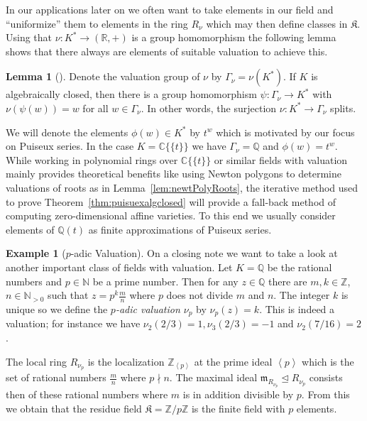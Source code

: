 \documentclass[
  paper=a4,
  titlepage,
  bibliography=totoc,
  listof=totoc,
  pagesize=pdftex
]{scrartcl}
\numberwithin{figure}{section}
\numberwithin{equation}{section}
\numberwithin{table}{section}
\newcommand*\setZ{\mathds{Z}}
\newcommand*\setR{\mathds{R}}
\newcommand*\setC{\mathds{C}}
\newcommand*\setQ{\mathds{Q}}
\newcommand*\setN{\mathds{N}}
\newcommand*\ideal[1]{\left\langle #1 \right\rangle}
\newcommand*\puiseux[2]{#1\{\!\{#2\}\!\}}
\newcommand*\CCt{\puiseux{\setC}{t}}
\let\idealof\trianglelefteq
\theoremstyle{definition}
\newtheorem{example}[definition]{Example}
\newtheorem{lemma}[definition]{Lemma}
\numberwithin{definition}{section}
\begin{document}
In our applications later on we often want to take elements in our field and
\enquote{uniformize} them to elements in the ring $R_{\nu}$ which may then define classes
in $\mathfrak K$. Using that $\nu : K^* \to (\setR, +)$ is a group homomorphism the
following lemma shows that there always are elements of suitable valuation to achieve
this.

\begin{lemma}[{\cite[Lemma~2.1.15]{sturmMacTrop}}]
  \label{lem:valSplit}
  Denote the valuation group of $\nu$ by $\Gamma_\nu = \nu(K^*)$. If $K$ is algebraically
  closed, then there is a group homomorphism $\psi : \Gamma_\nu \to K^*$ with
  $\nu(\psi(w)) = w$ for all $w \in \Gamma_\nu$. In other words, the surjection $\nu : K^*
  \to \Gamma_\nu$ splits.
\end{lemma}

We will denote the elements $\phi(w) \in K^*$ by $t^w$ which is motivated by our focus on
Puiseux series. In the case $K = \CCt$ we have $\Gamma_\nu = \setQ$ and $\phi(w) = t^w$.
While working in polynomial rings over $\CCt$ or similar fields with valuation mainly
provides theoretical benefits like using Newton polygons to determine valuations of roots
as in Lemma~\ref{lem:newtPolyRoots}, the iterative method used to prove
Theorem~\ref{thm:puisuexalgclosed} will provide a fall-back method of computing
zero-dimensional affine varieties. To this end we usually consider elements of $\setQ(t)$
as finite approximations of Puiseux series.

\begin{example}[$p$-adic Valuation] \label{ex:pAdic}
  On a closing note we want to take a look at another important class of fields with
  valuation. Let $K = \setQ$ be the rational numbers and $p\in \setN$ be a prime number.
  Then for any $z \in \setQ$ there are $m, k \in \setZ$, $n \in \setN_{>0}$ such that $z =
  p^k \frac mn$ where $p$ does not divide $m$ and $n$. The integer $k$ is unique so we
  define the \emph{$p$-adic valuation $\nu_p$} by $\nu_p(z) = k$. This is indeed a
  valuation; for instance we have $\nu_2(2/3) = 1, \nu_3(2/3)=-1$ and $\nu_2(7/16)=2$.

  The local ring $R_{\nu_p}$ is the localization $\setZ_{\ideal p}$ at the prime ideal
  $\ideal p$ which is the set of rational numbers $\frac mn$ where $p \nmid n$. The
  maximal ideal $\mathfrak m_{R_{\nu_p}} \idealof R_{\nu_p}$ consists then of these
  rational numbers where $m$ is in addition divisible by $p$. From this we obtain that
  the residue field $\mathfrak K = \setZ/p\setZ$ is the finite field with $p$ elements.
\end{example}
\end{document}
